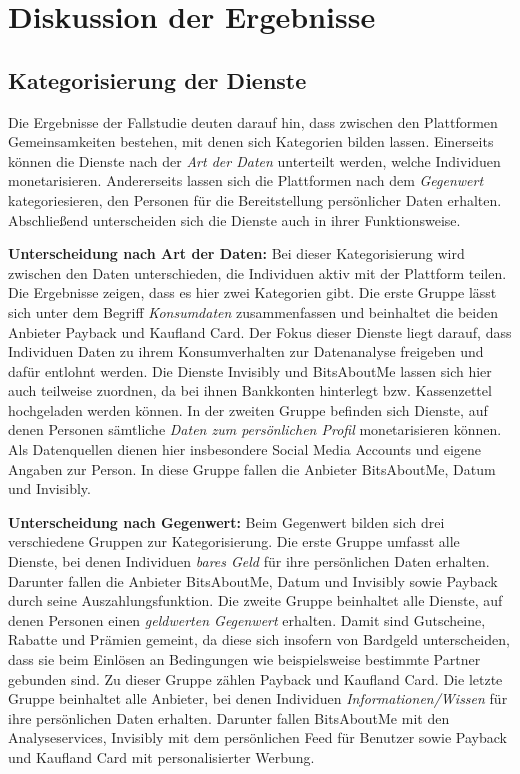 \section{Diskussion der Ergebnisse}

\subsection{Kategorisierung der Dienste}
Die Ergebnisse der Fallstudie deuten darauf hin, dass zwischen den Plattformen Gemeinsamkeiten bestehen, mit denen sich Kategorien bilden lassen. Einerseits können die Dienste nach der \textit{Art der Daten} unterteilt werden, welche Individuen monetarisieren. Andererseits lassen sich die Plattformen nach dem \textit{Gegenwert} kategoriesieren, den Personen für die Bereitstellung persönlicher Daten erhalten. Abschließend unterscheiden sich die Dienste auch in ihrer Funktionsweise. \newline

\noindent \textbf{Unterscheidung nach Art der Daten:} Bei dieser Kategorisierung wird zwischen den Daten unterschieden, die Individuen aktiv mit der Plattform teilen. Die Ergebnisse zeigen, dass es hier zwei Kategorien gibt. Die erste Gruppe lässt sich unter dem Begriff \textit{Konsumdaten} zusammenfassen und beinhaltet die beiden Anbieter Payback und Kaufland Card. Der Fokus dieser Dienste liegt darauf, dass Individuen Daten zu ihrem Konsumverhalten zur Datenanalyse freigeben und dafür entlohnt werden. Die Dienste Invisibly und BitsAboutMe lassen sich hier auch teilweise zuordnen, da bei ihnen Bankkonten hinterlegt bzw. Kassenzettel hochgeladen werden können. In der zweiten Gruppe befinden sich Dienste, auf denen Personen sämtliche \textit{Daten zum persönlichen Profil} monetarisieren können. Als Datenquellen dienen hier insbesondere Social Media Accounts und eigene Angaben zur Person. In diese Gruppe fallen die Anbieter BitsAboutMe, Datum und Invisibly. \newline

\noindent \textbf{Unterscheidung nach Gegenwert:} Beim Gegenwert bilden sich drei verschiedene Gruppen zur Kategorisierung. Die erste Gruppe umfasst alle Dienste, bei denen Individuen \textit{bares Geld} für ihre persönlichen Daten erhalten. Darunter fallen die Anbieter BitsAboutMe, Datum und Invisibly sowie Payback durch seine Auszahlungsfunktion. Die zweite Gruppe beinhaltet alle Dienste, auf denen Personen einen \textit{geldwerten Gegenwert} erhalten. Damit sind Gutscheine, Rabatte und Prämien gemeint, da diese sich insofern von Bardgeld unterscheiden, dass sie beim Einlösen an Bedingungen wie beispielsweise bestimmte Partner gebunden sind. Zu dieser Gruppe zählen Payback und Kaufland Card. Die letzte Gruppe beinhaltet alle Anbieter, bei denen Individuen \textit{Informationen/Wissen} für ihre persönlichen Daten erhalten. Darunter fallen BitsAboutMe mit den Analyseservices, Invisibly mit dem persönlichen Feed für Benutzer sowie Payback und Kaufland Card mit personalisierter Werbung. \newline




